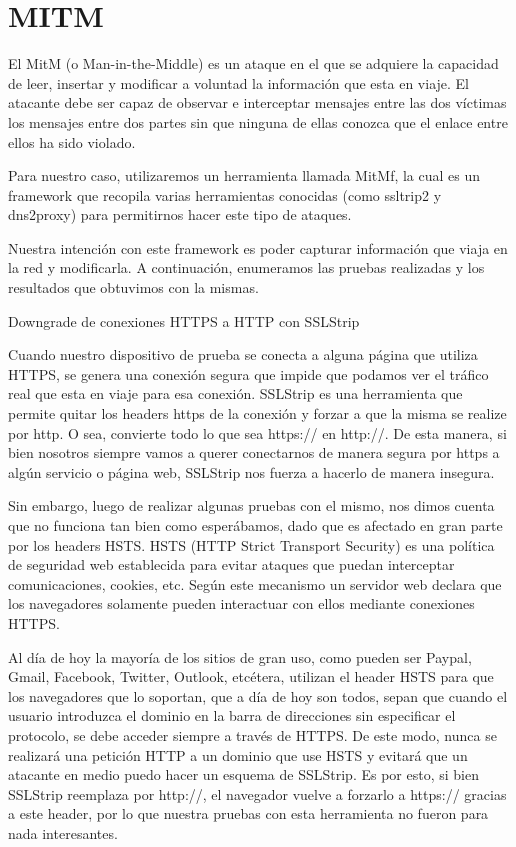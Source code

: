 \section{MITM}

El MitM (o Man-in-the-Middle) es un ataque en el que se adquiere la capacidad de leer, insertar y modificar a voluntad la información que esta en viaje. El atacante debe ser capaz de observar e interceptar mensajes entre las dos víctimas los mensajes entre dos partes sin que ninguna de ellas conozca que el enlace entre ellos ha sido violado. 

Para nuestro caso, utilizaremos un herramienta llamada MitMf, la cual es un framework que recopila varias herramientas conocidas (como ssltrip2 y dns2proxy) para permitirnos hacer este tipo de ataques. 

Nuestra intención con este framework es poder capturar información que viaja en la red y modificarla. A continuación, enumeramos las pruebas realizadas y los resultados que obtuvimos con la mismas.

Downgrade de conexiones HTTPS a HTTP con SSLStrip

Cuando nuestro dispositivo de prueba se conecta a alguna página que utiliza HTTPS, se genera una conexión segura que impide que podamos ver el tráfico real que esta en viaje para esa conexión. SSLStrip es una herramienta que permite quitar los headers https de la conexión y forzar a que la misma se realize por http. O sea, convierte todo lo que sea https:// en http://. De esta manera, si bien nosotros siempre vamos a querer conectarnos de manera segura por https a algún servicio o página web, SSLStrip nos fuerza a hacerlo de manera insegura.

Sin embargo, luego de realizar algunas pruebas con el mismo, nos dimos cuenta que no funciona tan bien como esperábamos, dado que es afectado en gran parte por los headers HSTS. HSTS (HTTP Strict Transport Security) es una política de seguridad web establecida para evitar ataques que puedan interceptar comunicaciones, cookies, etc. Según este mecanismo un servidor web declara que los navegadores solamente pueden interactuar con ellos mediante conexiones HTTPS. 

Al día de hoy la mayoría de los sitios de gran uso, como pueden ser Paypal, Gmail, Facebook, Twitter, Outlook, etcétera, utilizan el header HSTS para que los navegadores que lo soportan, que a día de hoy son todos, sepan que cuando el usuario introduzca el dominio en la barra de direcciones sin especificar el protocolo, se debe acceder siempre a través de HTTPS. De este modo, nunca se realizará una petición HTTP a un dominio que use HSTS y evitará que un atacante en medio puedo hacer un esquema de SSLStrip. Es por esto, si bien SSLStrip reemplaza por http://, el navegador vuelve a forzarlo a https:// gracias a este header, por lo que nuestra pruebas con esta herramienta no fueron para nada interesantes.

